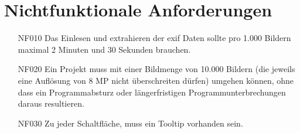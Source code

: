 \section{Nichtfunktionale Anforderungen}

\begin{itemize}
	
	\item[NF010] Das Einlesen und extrahieren der \gls{exif} Daten sollte pro 1.000 Bildern maximal 2 Minuten und 30 Sekunden brauchen.
	
	\item[NF020] Ein Projekt muss mit einer Bildmenge von 10.000 Bildern (die jeweils eine Auflösung von 8 MP nicht überschreiten dürfen) umgehen können, ohne dass ein Programmabsturz oder längerfristigen Programmunterbrechungen daraus resultieren.

	\item[NF030] Zu jeder Schaltfläche, muss ein Tooltip vorhanden sein.
	
\end{itemize}